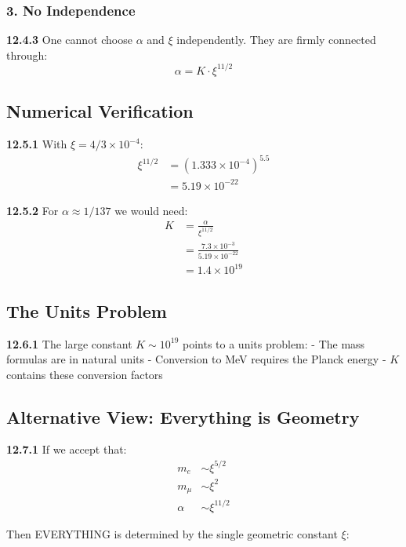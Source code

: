\documentclass[12pt,a4paper]{article}
\begin{document}
\subsubsection{3. No Independence}
\noindent \textbf{12.4.3} One cannot choose $\alpha$ and $\xi$ independently. They are firmly connected through:
\begin{equation}
	\alpha = K \cdot \xi^{11/2}
\end{equation}

\subsection{Numerical Verification}

\noindent \textbf{12.5.1} With $\xi = 4/3 \times 10^{-4}$:
\begin{align}
	\xi^{11/2} &= (1.333 \times 10^{-4})^{5.5} \\
	&= 5.19 \times 10^{-22}
\end{align}

\noindent \textbf{12.5.2} For $\alpha \approx 1/137$ we would need:
\begin{align}
	K &= \frac{\alpha}{\xi^{11/2}} \\
	&= \frac{7.3 \times 10^{-3}}{5.19 \times 10^{-22}} \\
	&= 1.4 \times 10^{19}
\end{align}

\subsection{The Units Problem}

\noindent \textbf{12.6.1} The large constant $K \sim 10^{19}$ points to a units problem:
- The mass formulas are in natural units
- Conversion to MeV requires the Planck energy
- $K$ contains these conversion factors

\subsection{Alternative View: Everything is Geometry}

\noindent \textbf{12.7.1} If we accept that:
\begin{align}
	m_e &\sim \xi^{5/2} \\
	m_\mu &\sim \xi^2 \\
	\alpha &\sim \xi^{11/2}
\end{align}

Then EVERYTHING is determined by the single geometric constant $\xi$:
\end{document}
